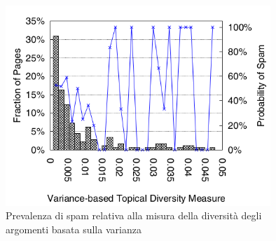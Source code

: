 \begin{figure}
\centering
\includegraphics[width=10cm]{immagini/zhou/immagine2.png}
\caption{Prevalenza di spam relativa alla misura della  diversità degli argomenti basata sulla varianza }
\label{fig:zhou2}
\end{figure}


